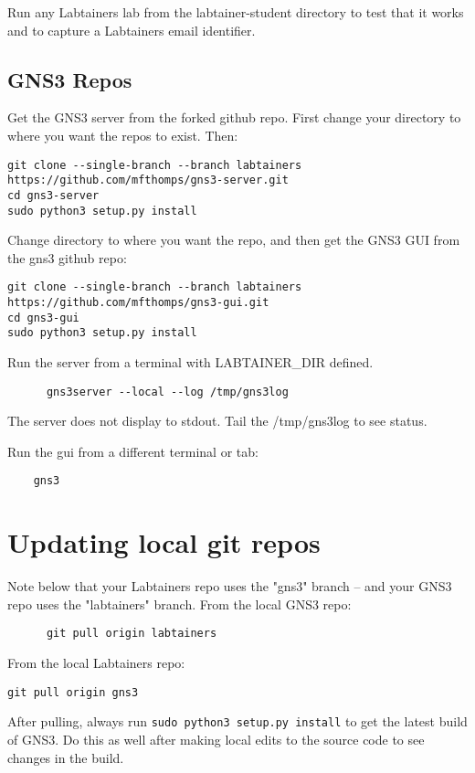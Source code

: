 \documentclass[12pt]{article}
\begin{document}
\vspace{5mm}

\noindent
Run any Labtainers lab from the labtainer-student directory to test that it works and to capture a Labtainers email identifier.

\subsection{GNS3 Repos}
Get the GNS3 server from the forked github repo.  First change your directory to where you want the repos to
exist.  Then:
\small
\begin{verbatim}
git clone --single-branch --branch labtainers https://github.com/mfthomps/gns3-server.git
cd gns3-server
sudo python3 setup.py install
\end{verbatim}

Change directory to where you want the repo, and then get the GNS3 GUI from the gns3 github repo:
\small
\begin{verbatim}
git clone --single-branch --branch labtainers  https://github.com/mfthomps/gns3-gui.git
cd gns3-gui
sudo python3 setup.py install
\end{verbatim}
\normalsize
\noindent Run the server from a terminal with LABTAINER\_DIR defined.

\begin{verbatim}
      gns3server --local --log /tmp/gns3log
\end{verbatim}
\noindent The server does not display to stdout.  Tail the /tmp/gns3log to see status.

\noindent Run the gui from a different terminal or tab:
\begin{verbatim}
    gns3
\end{verbatim}

\section{Updating local git repos}
Note below that your Labtainers repo uses the "gns3" branch -- and your GNS3 repo uses the "labtainers" branch.
From the local GNS3  repo:
\begin{verbatim}
      git pull origin labtainers
\end{verbatim}

From the local Labtainers repo:
\begin{verbatim}
git pull origin gns3
\end{verbatim}

After pulling, always run {\tt sudo python3 setup.py install} to get the latest 
build of GNS3. Do this as well after making local edits to the source code to see changes in the build.
\end{document}
